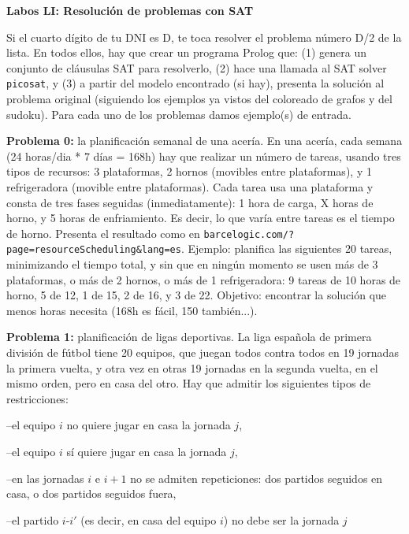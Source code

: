 \documentclass[11pt]{article}
\begin{document}
\thispagestyle{empty}

\begin{center}
{\Large\bf Labos LI: Resolución de problemas con SAT} \qquad 
\end{center}


Si el cuarto dígito de tu DNI es D, te toca resolver el problema número D/2 de la lista.
En todos ellos, hay que crear un programa Prolog que: (1) genera un conjunto de cláusulas SAT
para resolverlo, (2) hace una llamada al SAT solver \texttt{picosat}, y (3) a partir del modelo
encontrado (si hay), presenta la solución al problema original (siguiendo los ejemplos ya vistos del
coloreado de grafos y del sudoku). Para cada uno de los problemas damos ejemplo(s) de entrada.
\medskip

\textbf{Problema 0:} la planificación semanal de una acería. En una acería, cada semana (24 horas/dia *
7 días = 168h) hay que realizar un número de tareas, usando tres tipos de recursos: 3 plataformas,
2 hornos (movibles entre plataformas), y 1 refrigeradora (movible entre plataformas). Cada tarea
usa una plataforma y consta de tres fases seguidas (inmediatamente): 1 hora de carga, X horas de
horno, y 5 horas de enfriamiento. Es decir, lo que varía entre tareas es el tiempo de horno. Presenta
el resultado como en \texttt{barcelogic.com/?page=resourceScheduling\&lang=es}. Ejemplo: planifica
las siguientes 20 tareas, minimizando el tiempo total, y sin que en ningún momento se usen más
de 3 plataformas, o más de 2 hornos, o más de 1 refrigeradora: 9 tareas de 10 horas de horno, 5
de 12, 1 de 15, 2 de 16, y 3 de 22. Objetivo: encontrar la solución que menos horas necesita (168h es fácil,
150 también...).
\medskip


\textbf{Problema 1:} planificación de ligas deportivas. La liga española de primera división de fútbol tiene
20 equipos, que juegan todos contra todos en 19 jornadas la primera vuelta, y otra vez en otras
19 jornadas en la segunda vuelta, en el mismo orden, pero en casa del otro. Hay que admitir los
siguientes tipos de restricciones:

–el equipo $i$ no quiere jugar en casa la jornada $j$,

–el equipo $i$ sí quiere jugar en casa la jornada $j$,

–en las jornadas $i$ e $i + 1$ no se admiten repeticiones: dos partidos seguidos en casa, o dos partidos
seguidos fuera,

–el partido $i$-$i'$ (es decir, en casa del equipo $i$) no debe ser la jornada $j$
\end{document}
